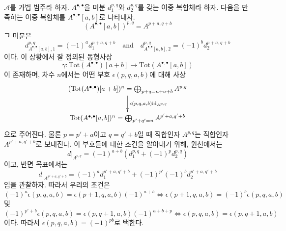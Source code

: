 \begin{remark}
\label{remark-shift-double-complex}
$\mathcal{A}$를 가법 범주라 하자.
$A^{\bullet, \bullet}$을 미분 $d_1^{p, q}$와 $d_2^{p, q}$를 갖는
이중 복합체라 하자. 다음을 만족하는 이중 복합체를
$A^{\bullet, \bullet}[a, b]$로 나타내자.
$$
(A^{\bullet, \bullet}[a, b])^{p, q} = A^{p + a, q + b}
$$
그 미분은
$$
d_{A^{\bullet, \bullet}[a, b], 1}^{p, q} = (-1)^a d_1^{p + a, q + b}
\quad\text{and}\quad
d_{A^{\bullet, \bullet}[a, b], 2}^{p, q} = (-1)^b d_2^{p + a, q + b}
$$
이다. 이 상황에서 잘 정의된 동형사상
$$
\gamma :
\text{Tot}(A^{\bullet, \bullet})[a + b]
\longrightarrow
\text{Tot}(A^{\bullet, \bullet}[a, b])
$$
이 존재하며, 차수 $n$에서는 어떤 부호 $\epsilon(p, q, a, b)$에
대해 사상
$$
\xymatrix{
(\text{Tot}(A^{\bullet, \bullet})[a + b])^n =
\bigoplus_{p + q = n + a + b} A^{p, q}
\ar[d]^{\epsilon(p, q, a, b)\text{id}_{A^{p, q}}} \\
\text{Tot}(A^{\bullet, \bullet}[a, b])^n =
\bigoplus_{p' + q' = n} A^{p' + a, q' + b}
}
$$
으로 주어진다. 물론 $p = p' + a$이고 $q = q' + b$일 때 직합인자
$A^{p, q}$는 직합인자 $A^{p' + a, q' + b}$로 보내진다.
이 부호들에 대한 조건을 알아내기 위해, 원천에서는
$$
d|_{A^{p, q}} = (-1)^{a + b}\left(d_1^{p, q} + (-1)^pd_2^{p, q}\right)
$$
이고, 반면 목표에서는
$$
d|_{A^{p' + a, q' + b}} =
(-1)^ad_1^{p' + a, q' + b} + (-1)^{p'}(-1)^bd_2^{p' + a, q' + b}
$$
임을 관찰하자. 따라서 우리의 조건은
$$
(-1)^a \epsilon(p, q, a, b) = \epsilon(p + 1, q, a, b)(-1)^{a + b}
\Leftrightarrow
\epsilon(p + 1, q, a, b) = (-1)^b \epsilon(p, q, a, b)
$$
및
$$
(-1)^{p' + b}\epsilon(p, q, a, b) =
\epsilon(p, q + 1, a, b) (-1)^{a + b + p}
\Leftrightarrow
\epsilon(p, q, a, b) = \epsilon(p, q + 1, a, b)
$$
이다. 따라서 $\epsilon(p, q, a, b) = (-1)^{pb}$로 택한다.
\end{remark}

